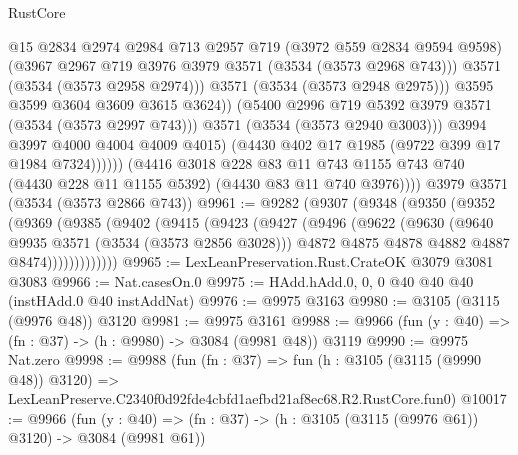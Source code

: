 \begin{lexlean}{RustCore}
\begin{coremodule}
                            @15
                            @2834
                            @2974
                            @2984
                            @713
                            @2957
                            @719
                            (@3972 @559 @2834 @9594 @9598)
                            (@3967 @2967 @719 @3976 @3979 @3571 (@3534 (@3573 @2968 @743)))
                            @3571
                            (@3534 (@3573 @2958 @2974)))
                          @3571
                          (@3534 (@3573 @2948 @2975)))
                        @3595
                        @3599
                        @3604
                        @3609
                        @3615
                        @3624))
                    (@5400 @2996 @719 @5392 @3979 @3571 (@3534 (@3573 @2997 @743)))
                    @3571
                    (@3534 (@3573 @2940 @3003)))
                  @3994
                  @3997
                  @4000
                  @4004
                  @4009
                  @4015)
                (@4430 @402 @17 @1985 (@9722 @399 @17 @1984 @7324))))))
        (@4416
          @3018
          @228
          @83
          @11
          @743
          @1155
          @743
          @740
          (@4430 @228 @11 @1155 @5392)
          (@4430 @83 @11 @740 @3976))))
    @3979
    @3571
    (@3534 (@3573 @2866 @743))
@9961 := @9282
    (@9307
      (@9348
        (@9350
          (@9352
            (@9369
              (@9385
                (@9402
                  (@9415
                    (@9423
                      (@9427
                        (@9496
                          (@9622
                            (@9630
                              (@9640 @9935 @3571 (@3534 (@3573 @2856 @3028)))
                              @4872
                              @4875
                              @4878
                              @4882
                              @4887
                              @8474)))))))))))))
@9965 := LexLeanPreservation.Rust.CrateOK @3079 @3081 @3083
@9966 := Nat.casesOn.{0}
@9975 := HAdd.hAdd.{0, 0, 0} @40 @40 @40 (instHAdd.{0} @40 instAddNat)
@9976 := @9975 @3163
@9980 := @3105 (@3115 (@9976 @48)) @3120
@9981 := @9975 @3161
@9988 := @9966 (fun (y : @40) => (fn : @37) -> (h : @9980) -> @3084 (@9981 @48)) @3119
@9990 := @9975 Nat.zero
@9998 := @9988
    (fun (fn : @37) =>
    fun (h : @3105 (@3115 (@9990 @48)) @3120) =>
    LexLeanPreserve.C2340f0d92fde4cbfd1aefbd21af8ec68.R2.RustCore.fun0)
@10017 := @9966
    (fun (y : @40) => (fn : @37) -> (h : @3105 (@3115 (@9976 @61)) @3120) -> @3084 (@9981 @61))

\end{coremodule}
\end{lexlean}
